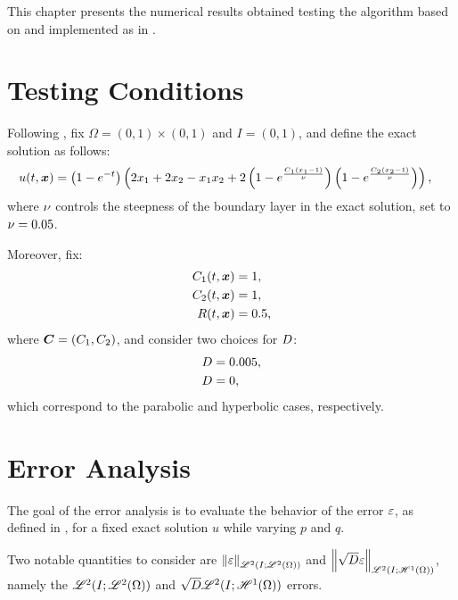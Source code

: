 This chapter presents the numerical results obtained testing the algorithm based on  and implemented as in .

\section{Testing Conditions}

Following \cite{Feistauer2007}, fix $\Omega = \left( 0, 1 \right) \times \left( 0, 1 \right)$ and $I = \left( 0, 1 \right)$, and define the exact solution as follows:
\begin{align}
    u(t, \bm{x}) &= \left( 1 - e^{-t} \right) \left( 2 x_1 + 2 x_2 - x_1 x_2 + 2 \left( 1 - e^{\frac{C_1 \left( x_1 - 1 \right) }{\nu}} \right) \left( 1 - e^{\frac{C_2 \left( x_2 - 1 \right) }{\nu}} \right) \right),
\end{align}
where $\nu$ controls the steepness of the boundary layer in the exact solution, set to $\nu = 0.05$.

Moreover, fix:
\begin{align}
    C_1(t, \bm{x}) &= 1, \\
    C_2(t, \bm{x}) &= 1, \\
    R(t, \bm{x}) &= 0.5,
\end{align}
where $\bm{C} = \left( C_1, C_2 \right)$, and consider two choices for $D$:
\begin{align}
    D &= 0.005, \\
    D &= 0,
\end{align}
which correspond to the parabolic and hyperbolic cases, respectively.

\newpage
\section{Error Analysis} \label{section:error_results}

The goal of the error analysis is to evaluate the behavior of the error $\varepsilon$, as defined in , for a fixed exact solution $u$ while varying $p$ and $q$.

Two notable quantities to consider are $\left\lVert \varepsilon \right\rVert_{\mathscr{L}^{2}(I; \mathscr{L}^{2}(\Omega))}$ and $\left\lVert \sqrt{D} \varepsilon \right\rVert_{\mathscr{L}^{2}(I; \mathscr{H}^{1}(\Omega))}$, namely the $\mathscr{L}^{2}(I; \mathscr{L}^{2}(\Omega))$ and $\sqrt{D} \mathscr{L}^{2}(I; \mathscr{H}^{1}(\Omega))$ errors.

